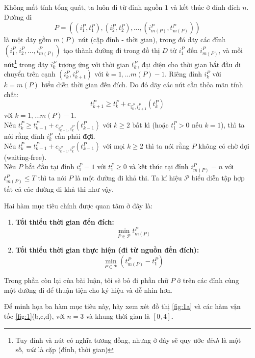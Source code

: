 \documentclass[../main.tex]{subfiles}
\begin{document}
Không mất tính tổng
quát, ta luôn đi từ đỉnh nguồn \(1\) và kết thúc ở đỉnh đích
\(n\). Đường đi
\[
  P=((i_1^P, t_1^P), (i_2^P, t_2^P), \dots, (i_{m(P)}^P, t_{m(P)}^P))
\]
là một dãy gồm \(m(P)\) nút (cặp đỉnh - thời gian), trong đó dãy các đỉnh
\((i_1^P, i_2^P, \dots, i_{m(P)}^P)\) tạo thành đường đi trong đồ thị
\(D\) từ \(i_1^P\) đến \(i_{m(P)}^P\), và mỗi nút\footnote{Tuy đỉnh và nút có nghĩa tương đồng, nhưng ở đây sẽ quy ước \emph{đỉnh} là một số, \emph{nút} là cặp (đỉnh, thời gian)} trong dãy \(i_k^P\)
tương ứng với thời gian \(t_k^P\), đại diện cho thời gian bắt đầu di
chuyển trên cạnh \((i_k^P, i_{k+1}^P)\) với \(k=1, \dots m(P)-1\). Riêng
đỉnh \(i_k^P\) với \(k=m(P)\) biểu diễn thời gian đến đích. Do đó dãy
các nút cần thỏa mãn tính chất:
\[t_{k+1}^P \ge t_k^P + c_{i_k^P, i_{k+1}^P}(t_k^P)\] với
\(k=1, \dots m(P)-1\). \\
Nếu
\(t_{k}^P \ge t_{k-1}^P + c_{i_{k-1}^P, i_{k}^P}(t_{k-1}^P)\) với \(k \ge 2\) bất kì (hoặc \(t_1^P > 0\) nếu \(k=1\)), thì ta nói rằng đỉnh \(i_k^P\)
cần phải \textbf{đợi}.\\ 
Nếu \(t_{k}^P = t_{k-1}^P + c_{i_{k-1}^P, i_{k}^P}(t_{k-1}^P)\) với mọi
\(k \ge 2\) thì ta nói rằng \(P\) không có chờ đợi (waiting-free). \\
Nếu \(P\) bắt đầu tại đỉnh \(i_1^P = 1\) với \(t_1^P\ge0\) và kết thúc tại
đỉnh \(i_{m(P)}^P=n\) với \(t_{m(P)}^P \le T\) thì ta nói \(P\) là một
đường đi khả thi. Ta kí hiệu \(\mathcal{P}\) biểu diễn tập hợp tất cả các
đường đi khả thi như vậy.

Hai hàm mục tiêu chính được quan tâm ở đây là:

\begin{enumerate}
\def\labelenumi{\arabic{enumi}.}
\tightlist
\item
  \textbf{Tối thiểu thời gian đến đích:}
  \[\min_{P\in \mathcal P}t_{m(P)}^P\]
\item
  \textbf{Tối thiểu thời gian thực hiện (đi từ nguồn đến đích):}
  \[\min_{P\in \mathcal P}(t_{m(P)}^P-t_1^P)\]
\end{enumerate}

Trong phần còn lại của bài luận, tôi sẽ bỏ đi phần chữ \(P\) ở trên các đỉnh cùng một đường đi để thuận tiện cho ký hiệu và dễ nhìn
hơn.

Để minh họa ba hàm mục tiêu này, hãy xem xét đồ thị \autoref{fig:1a} và các hàm vận tốc 
\autoref{fig:1}(b,c,d), với \(n = 3\) và khung thời gian
là \([0, 4]\).
\end{document}
